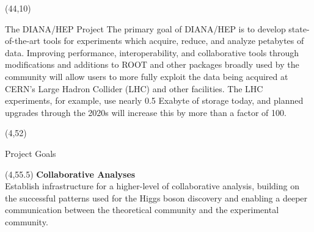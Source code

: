 \documentclass[final]{beamer}
\begin{document}
\begin{frame}{}



\begin{textblock}{38.0}(44,10)
\begin{block}{The DIANA/HEP Project}
The primary goal of DIANA/HEP is to develop state-of-the-art tools
for experiments which acquire, reduce, and analyze petabytes of
data. Improving performance, interoperability, and collaborative
tools through modifications and additions to ROOT and other packages
broadly used by the community will allow users to more fully exploit
the data being acquired at CERN's Large Hadron Collider (LHC) and
other facilities. The LHC experiments, for example, use nearly 0.5 Exabyte of
storage today, and planned upgrades through the 2020s will increase this
by more than a factor of 100. 
\end{block}
\end{textblock}

\begin{textblock}{78.0}(4,52)
\begin{block}{Project Goals}
\end{block}
\end{textblock}

\begin{textblock}{22.5}(4,55.5)
\textcolor{mybluelabel}{\bf Collaborative Analyses} \\
Establish infrastructure for a higher-level of collaborative analysis, building on the successful patterns used for the Higgs boson discovery and enabling a deeper communication between the theoretical community and the experimental community. 
\end{textblock}


\end{frame}
\end{document}
